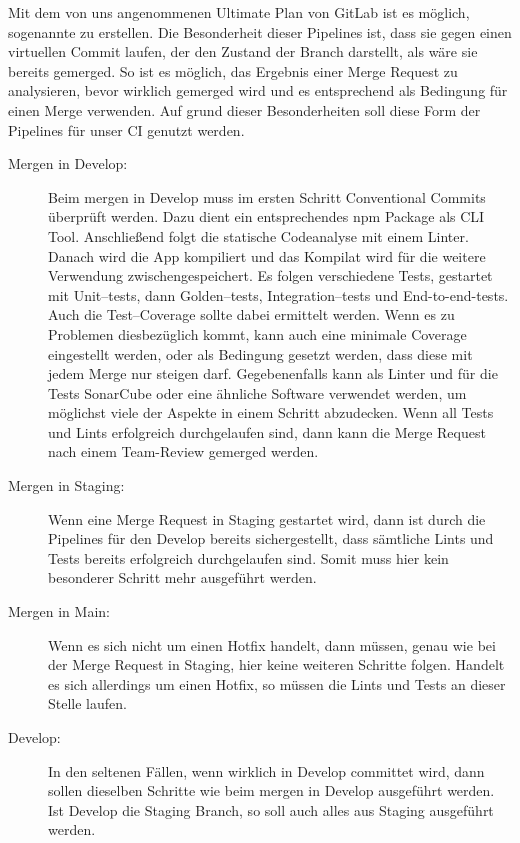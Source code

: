 Mit dem von uns angenommenen Ultimate Plan von GitLab ist es möglich, sogenannte  zu erstellen.
Die Besonderheit dieser Pipelines ist, dass sie gegen einen virtuellen Commit laufen, der den Zustand der Branch darstellt, als wäre sie bereits gemerged.
So ist es möglich, das Ergebnis einer Merge Request zu analysieren, bevor wirklich gemerged wird und es entsprechend als Bedingung für einen Merge verwenden.
Auf grund dieser Besonderheiten soll diese Form der Pipelines für unser CI genutzt werden.

\begin{description}
    \item[Mergen in Develop:]
        Beim mergen in Develop muss im ersten Schritt Conventional Commits überprüft werden.
        Dazu dient ein entsprechendes npm Package als CLI Tool.
        Anschließend folgt die statische Codeanalyse mit einem Linter.
        Danach wird die App kompiliert und das Kompilat wird für die weitere Verwendung zwischengespeichert.
        Es folgen verschiedene Tests, gestartet mit Unit--tests, dann Golden--tests, Integration--tests und End-to-end-tests.
        Auch die Test--Coverage sollte dabei ermittelt werden.
        Wenn es zu Problemen diesbezüglich kommt, kann auch eine minimale Coverage eingestellt werden, oder als Bedingung gesetzt werden, dass diese mit jedem Merge nur steigen darf.
        Gegebenenfalls kann als Linter und für die Tests SonarCube oder eine ähnliche Software verwendet werden, um möglichst viele der Aspekte in einem Schritt abzudecken.
        Wenn all Tests und Lints erfolgreich durchgelaufen sind, dann kann die Merge Request nach einem Team-Review gemerged werden.


    \item[Mergen in Staging:]
        Wenn eine Merge Request in Staging gestartet wird, dann ist durch die Pipelines für den Develop bereits sichergestellt, dass sämtliche Lints und Tests bereits erfolgreich durchgelaufen sind.
        Somit muss hier kein besonderer Schritt mehr ausgeführt werden.


    \item[Mergen in Main:]
        Wenn es sich nicht um einen Hotfix handelt, dann müssen, genau wie bei der Merge Request in Staging, hier keine weiteren Schritte folgen.
        Handelt es sich allerdings um einen Hotfix, so müssen die Lints und Tests an dieser Stelle laufen.


    \item[Develop:]
        In den seltenen Fällen, wenn wirklich in Develop committet wird, dann sollen dieselben Schritte wie beim mergen in Develop ausgeführt werden.
        Ist Develop die Staging Branch, so soll auch alles aus Staging ausgeführt werden.


\end{description}
